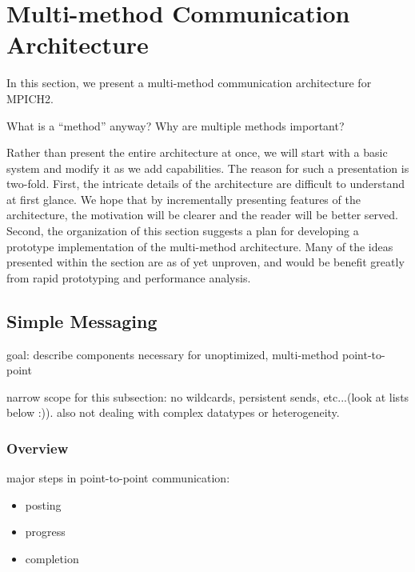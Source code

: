 \section{Multi-method Communication Architecture}

In this section, we present a multi-method communication architecture
for MPICH2.

What is a ``method'' anyway?  Why are multiple methods important?

Rather than present the entire architecture at once, we will start
with a basic system and modify it as we add capabilities.  The reason
for such a presentation is two-fold.  First, the intricate details of
the architecture are difficult to understand at first glance.  We hope
that by incrementally presenting features of the architecture, the
motivation will be clearer and the reader will be better served.
Second, the organization of this section suggests a plan for
developing a prototype implementation of the multi-method
architecture.  Many of the ideas presented within the section are as
of yet unproven, and would be benefit greatly from rapid prototyping
and performance analysis.




\subsection{Simple Messaging}

goal: describe components necessary for unoptimized, multi-method
point-to-point

narrow scope for this subsection: no wildcards, persistent sends, etc...(look
at lists below :)).  also not dealing with complex datatypes or heterogeneity.


\subsubsection{Overview}

major steps in point-to-point communication:
\begin{itemize}
\item posting
\item progress
\item completion
\end{itemize}

